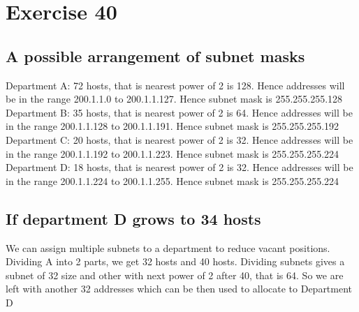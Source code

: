 \documentclass{article}
\begin{document}
\pagebreak{}

\pagebreak{}

\section{Exercise 40}
\subsection{A possible arrangement of subnet masks}
Department A: 72 hosts, that is nearest power of 2 is 128. Hence addresses will be in the range 200.1.1.0 to 200.1.1.127. Hence subnet mask is 255.255.255.128\\
Department B: 35 hosts, that is nearest power of 2 is 64. Hence addresses will be in the range 200.1.1.128 to 200.1.1.191. Hence subnet mask is 255.255.255.192\\
Department C: 20 hosts, that is nearest power of 2 is 32. Hence addresses will be in the range 200.1.1.192 to 200.1.1.223. Hence subnet mask is 255.255.255.224\\
Department D: 18 hosts, that is nearest power of 2 is 32. Hence addresses will be in the range 200.1.1.224 to 200.1.1.255. Hence subnet mask is 255.255.255.224\\
\subsection{If department D grows to 34 hosts}
We can assign multiple subnets to a department to reduce vacant positions. Dividing A into 2 parts, we get 32 hosts and 40 hosts. Dividing subnets gives a subnet of 32 size and other with next power of 2 after 40, that is 64. So we are left with another 32 addresses which can be then used to allocate to Department D
\end{document}
